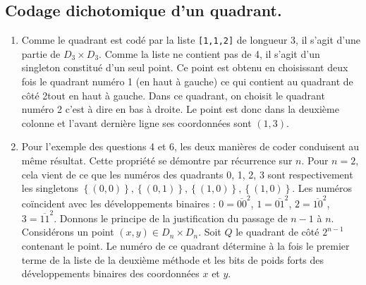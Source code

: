 \subsection{Codage dichotomique d'un quadrant.}
\begin{enumerate}[resume]
 \item Comme le quadrant est codé par la liste \texttt{[1,1,2]} de longueur 3, il s'agit d'une partie de $D_3 \times D_3$. Comme la liste ne contient pas de 4, il s'agit d'un singleton constitué d'un seul point. Ce point est obtenu en choisissant deux fois le quadrant numéro 1 (en haut à gauche) ce qui contient au quadrant de côté 2tout en haut à gauche. Dans ce quadrant, on choisit le quadrant numéro 2 c'est à dire en bas à droite. Le point est donc dans la deuxième colonne et l'avant dernière ligne ses coordonnées sont $(1,3)$.
 
 \item Pour l'exemple des questions 4 et 6, les deux manières de coder conduisent au même résultat. Cette propriété se démontre par récurrence sur $n$.\newline
 Pour $n = 2$, cela vient de ce que les numéros des quadrants 0, 1, 2, 3 sont respectivement les singletons $\left\lbrace (0,0)\right\rbrace, \left\lbrace (0,1)\right\rbrace, \left\lbrace (1,0)\right\rbrace, \left\lbrace (1,0)\right\rbrace$. Les numéros coïncident avec les développements binaires : $0 = \overline{00}^2$, $1 = \overline{01}^2$, $2 = \overline{10}^2$, $3 = \overline{11}^2$.\newline
 Donnons le principe de la justification du passage de $n-1$ à $n$. Considérons un point $(x,y) \in D_n\times D_n$. Soit $Q$ le quadrant de côté $2^{n-1}$ contenant le point. Le numéro de ce quadrant détermine à la fois le premier terme de la liste de la deuxième méthode et les bits de poids forts des développements binaires des coordonnées $x$ et $y$.
\end{enumerate}


